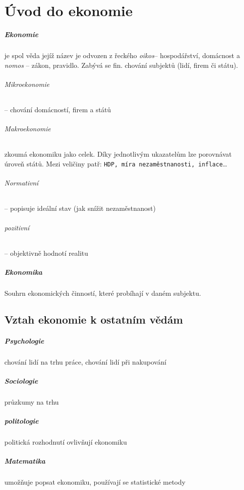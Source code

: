 \documentclass[10pt,a4paper,
twoside,%
]{report}
\begin{document}
\chapter{Úvod do ekonomie}


\paragraph{Ekonomie} je spol věda jejíž název je odvozen z řeckého \emph{oikos}-- hospodářství, domácnost a \emph{nomos} -- zákon, pravidlo. Zabývá se fin. chování subjektů (lidí, firem či státu).
\subparagraph{Mikroekonomie} -- chování  domácností, firem a států

\subparagraph{Makroekonomie} zkoumá ekonomiku jako celek. Díky jednotlivým ukazatelům lze porovnávat úroveň států. Mezi veličiny patř: \texttt{HDP, míra nezaměstnanosti, inflace}\dots

\subparagraph{Normativní} -- popisuje ideální stav (jak snížit nezaměstnanost)

\subparagraph{pozitivní} -- objektivně hodnotí realitu

\paragraph{Ekonomika} Souhrn ekonomických činností, které probíhají v daném subjektu.
\section{Vztah ekonomie k ostatním vědám}
\paragraph{Psychologie} chování lidí na trhu práce, chování lidí při nakupování

\paragraph{Sociologie} průzkumy na trhu

\paragraph{politologie} politická rozhodnutí ovlivňují ekonomiku

\paragraph{Matematika} umožňuje popsat ekonomiku, používají se statistické metody
\end{document}
